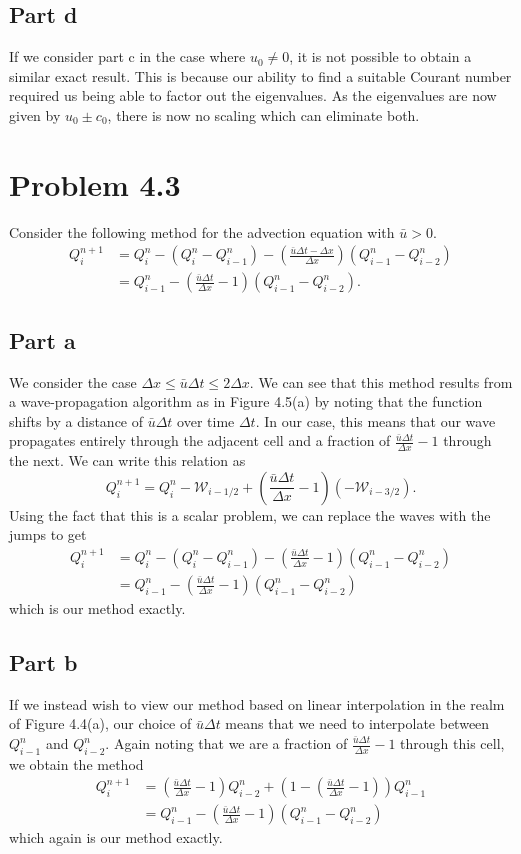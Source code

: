 \documentclass{article}
\begin{document}
\subsection{Part d}
If we consider part c in the case where $u_0\neq0$, it is not possible to obtain a similar exact result. This is because our ability to find a suitable Courant number required us being able to factor out the eigenvalues. As the eigenvalues are now given by $u_0\pm c_0$, there is now no scaling which can eliminate both.

\section{Problem 4.3}
Consider the following method for the advection equation with $\bar u>0$.
\begin{align*}
Q^{n+1}_i&=Q^n_i-(Q^n_i-Q^n_{i-1})-\left(\frac{\bar u\Delta t-\Delta x}{\Delta x}\right)(Q^n_{i-1}-Q^n_{i-2})\\&=
Q^n_{i-1}-\left(\frac{\bar u\Delta t}{\Delta x}-1\right)(Q^n_{i-1}-Q^n_{i-2}).
\end{align*}
\subsection{Part a}
We consider the case $\Delta x\leq\bar u\Delta t\leq2\Delta x$. We can see that this method results from a wave-propagation algorithm as in Figure 4.5(a) by noting that the function shifts by a distance of $\bar u\Delta t$ over time $\Delta t$. In our case, this means that our wave propagates entirely through the adjacent cell and a fraction of $\frac{\bar u\Delta t}{\Delta x}-1$ through the next. We can write this relation as
\[
Q_i^{n+1}=Q^n_i-\mathcal W_{i-1/2}+\left(\frac{\bar u\Delta t}{\Delta x}-1\right)(-\mathcal W_{i-3/2}).
\]
Using the fact that this is a scalar problem, we can replace the waves with the jumps to get
\begin{align*}
Q_i^{n+1}&=Q^n_i-(Q_i^n-Q^n_{i-1})-\left(\frac{\bar u\Delta t}{\Delta x}-1\right)(Q^n_{i-1}-Q^n_{i-2})\\&=
Q^n_{i-1}-\left(\frac{\bar u\Delta t}{\Delta x}-1\right)(Q^n_{i-1}-Q^n_{i-2})
\end{align*}
which is our method exactly.
\subsection{Part b}
If we instead wish to view our method based on linear interpolation in the realm of Figure 4.4(a), our choice of $\bar u\Delta t$ means that we need to interpolate between $Q^n_{i-1}$ and $Q^n_{i-2}$. Again noting that we are a fraction of $\frac{\bar u\Delta t}{\Delta x}-1$ through this cell, we obtain the method
\begin{align*}
Q^{n+1}_i&=\left(\frac{\bar u\Delta t}{\Delta x}-1\right)Q^n_{i-2}+\left(1-\left(\frac{\bar u\Delta t}{\Delta x}-1\right)\right)Q^n_{i-1}\\&=
Q^n_{i-1}-\left(\frac{\bar u\Delta t}{\Delta x}-1\right)(Q^n_{i-1}-Q^n_{i-2})
\end{align*}
which again is our method exactly.
\end{document}

